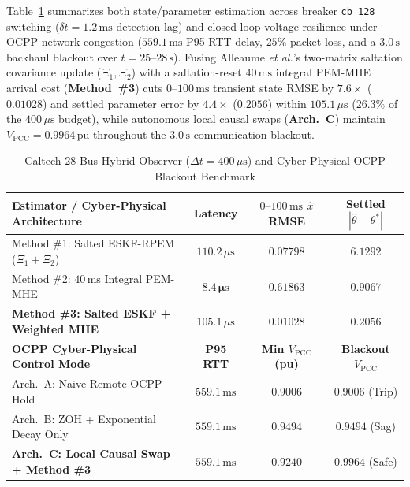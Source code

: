 \documentclass[journal]{IEEEtran}
\begin{document}
Table~\ref{tab:caltech_tsg_summary} summarizes both state/parameter estimation across breaker \texttt{cb\_128} switching ($\delta t = 1.2\,\mathrm{ms}$ detection lag) and closed-loop voltage resilience under OCPP network congestion ($559.1\,\mathrm{ms}$ P95 RTT delay, $25\%$ packet loss, and a $3.0\,\mathrm{s}$ backhaul blackout over $t = 25\text{--}28\,\mathrm{s}$). Fusing Alleaume \textit{et al.}'s two-matrix saltation covariance update ($\Xi_1, \Xi_2$) with a saltation-reset $40\,\mathrm{ms}$ integral PEM-MHE arrival cost (\textbf{Method~\#3}) cuts $0\text{--}100\,\mathrm{ms}$ transient state RMSE by $\mathbf{7.6\times}$ ($0.01028$) and settled parameter error by $\mathbf{4.4\times}$ ($0.2056$) within $105.1\,\mu\mathrm{s}$ ($26.3\%$ of the $400\,\mu\mathrm{s}$ budget), while autonomous local causal swaps (\textbf{Arch.~C}) maintain $V_{\mathrm{PCC}} = 0.9964\,\mathrm{pu}$ throughout the $3.0\,\mathrm{s}$ communication blackout.

\begin{table}[t]
\centering
\caption{Caltech 28-Bus Hybrid Observer ($\Delta t = 400\,\mu\mathrm{s}$) and Cyber-Physical OCPP Blackout Benchmark}
\label{tab:caltech_tsg_summary}
\scriptsize
\setlength{\tabcolsep}{3.2pt}
\renewcommand{\arraystretch}{1.15}
\begin{tabular}{@{}lccc@{}}
\toprule
\textbf{Estimator / Cyber-Physical Architecture} & \textbf{Latency} & \textbf{$0\text{--}100\,\mathrm{ms}$ $\hat{x}$ RMSE} & \textbf{Settled $|\hat{\theta}-\theta^*|$} \\
\midrule
Method \#1: Salted ESKF-RPEM ($\Xi_1 + \Xi_2$) & $110.2\,\mu\mathrm{s}$ & $0.07798$ & $6.1292$ \\
Method \#2: $40\,\mathrm{ms}$ Integral PEM-MHE & $\mathbf{8.4\,\mu\mathrm{s}}$ & $0.61863$ & $0.9067$ \\
\textbf{Method \#3: Salted ESKF + Weighted MHE} & $105.1\,\mu\mathrm{s}$ & $\mathbf{0.01028}$ & $\mathbf{0.2056}$ \\
\midrule
\textbf{OCPP Cyber-Physical Control Mode} & \textbf{P95 RTT} & \textbf{Min $V_{\mathrm{PCC}}$ (pu)} & \textbf{Blackout $V_{\mathrm{PCC}}$} \\
\midrule
Arch.~A: Naive Remote OCPP Hold & $559.1\,\mathrm{ms}$ & $0.9006$ & $0.9006$ (Trip) \\
Arch.~B: ZOH + Exponential Decay Only & $559.1\,\mathrm{ms}$ & $0.9494$ & $0.9494$ (Sag) \\
\textbf{Arch.~C: Local Causal Swap + Method \#3} & $559.1\,\mathrm{ms}$ & $\mathbf{0.9240}$ & $\mathbf{0.9964}$ (Safe) \\
\bottomrule
\end{tabular}
\end{table}
\end{document}
